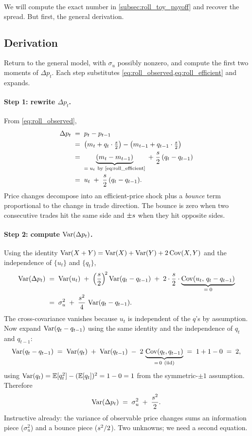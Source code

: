 We will compute the exact number in \cref{subsec:roll_toy_payoff}
and recover the spread. But first, the general derivation.

\subsection{Derivation}
\label{subsec:roll_derivation}

Return to the general model, with $\sigma_u$ possibly nonzero, and
compute the first two moments of $\Delta p_t$. Each step
substitutes \cref{eq:roll_observed,eq:roll_efficient} and expands.

\paragraph{Step 1: rewrite $\Delta p_t$.} From
\cref{eq:roll_observed},
\begin{align*}
  \Delta p_t
  \;&=\; p_t - p_{t-1} \\
  \;&=\; \bigl(m_t + q_t \cdot \tfrac{\spreads}{2}\bigr)
       - \bigl(m_{t-1} + q_{t-1} \cdot \tfrac{\spreads}{2}\bigr) \\
  \;&=\; \underbrace{(m_t - m_{t-1})}_{=\;u_t\ \text{by \cref{eq:roll_efficient}}}
       \;+\; \frac{\spreads}{2} \,(q_t - q_{t-1}) \\
  \;&=\; u_t \;+\; \frac{\spreads}{2} \,(q_t - q_{t-1}).
\end{align*}
Price changes decompose into an efficient-price shock plus a
\emph{bounce} term proportional to the change in trade direction.
The bounce is zero when two consecutive trades hit the same side
and $\pm s$ when they hit opposite sides.

\paragraph{Step 2: compute $\operatorname{Var}(\Delta p_t)$.} Using the identity
$\operatorname{Var}(X+Y) = \operatorname{Var}(X) + \operatorname{Var}(Y) + 2\operatorname{Cov}(X,Y)$ and the independence
of $\{u_t\}$ and $\{q_t\}$,
\begin{align*}
  \operatorname{Var}(\Delta p_t)
  \;&=\; \operatorname{Var}(u_t) \;+\; \left(\frac{s}{2}\right)^{\!2} \operatorname{Var}(q_t - q_{t-1})
       \;+\; 2 \cdot \frac{s}{2} \cdot \underbrace{\operatorname{Cov}(u_t,\,q_t - q_{t-1})}_{=\;0} \\
  \;&=\; \sigma_u^2 \;+\; \frac{s^2}{4} \,\operatorname{Var}(q_t - q_{t-1}).
\end{align*}
The cross-covariance vanishes because $u_t$ is independent of the
$q$'s by assumption. Now expand $\operatorname{Var}(q_t - q_{t-1})$ using the
same identity and the independence of $q_t$ and $q_{t-1}$:
\[
  \operatorname{Var}(q_t - q_{t-1})
  \;=\; \operatorname{Var}(q_t) \;+\; \operatorname{Var}(q_{t-1}) \;-\; 2 \,\underbrace{\operatorname{Cov}(q_t, q_{t-1})}_{=\,0\ \text{(iid)}}
  \;=\; 1 + 1 - 0 \;=\; 2,
\]
using $\operatorname{Var}(q_t) = \mathbb{E}[q_t^2] - (\mathbb{E}[q_t])^2 = 1 - 0 = 1$ from the
symmetric-$\pm 1$ assumption. Therefore
\begin{equation}
  \operatorname{Var}(\Delta p_t) \;=\; \sigma_u^2 \;+\; \frac{s^2}{2}.
  \label{eq:roll_variance}
\end{equation}
Instructive already: the variance of observable price changes
sums an information piece ($\sigma_u^2$) and a bounce piece
($s^2/2$). Two unknowns; we need a second equation.

